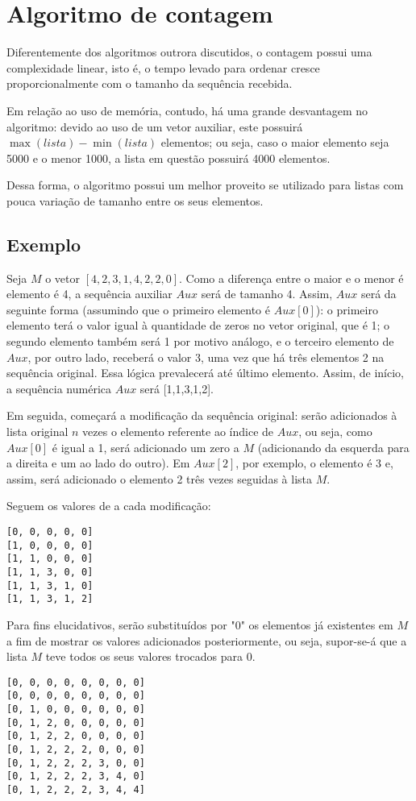 \section{Algoritmo de contagem}
Diferentemente dos algoritmos outrora discutidos, o contagem possui uma complexidade linear, isto é, o tempo levado para ordenar cresce proporcionalmente com o tamanho da sequência recebida. 

Em relação ao uso de memória, contudo, há uma grande desvantagem no algoritmo: devido ao uso de um vetor auxiliar, este possuirá $\max({lista})-\min({lista}) $ elementos; ou seja, caso o maior elemento seja 5000 e o menor 1000, a lista em questão possuirá 4000 elementos.

Dessa forma, o algoritmo possui um melhor proveito se utilizado para listas com pouca variação de tamanho entre os seus elementos.

\subsection{Exemplo}
Seja $M$ o vetor $[4,2,3,1,4,2,2,0]$. Como a diferença entre o maior e o menor é elemento é 4, a sequência auxiliar $Aux$ será de tamanho 4.
Assim, $Aux$ será da seguinte forma (assumindo que o primeiro elemento é $Aux[0]$): o primeiro elemento terá o valor igual à quantidade de zeros no vetor original, que é 1; o segundo elemento também será 1 por motivo análogo, e o terceiro elemento de $Aux$, por outro lado, receberá o valor 3, uma vez que há três elementos 2 na sequência original. Essa lógica prevalecerá até último elemento.
Assim, de início, a sequência numérica $Aux$ será [1,1,3,1,2].

Em seguida, começará a modificação da sequência original: serão adicionados à lista original $n$ vezes o elemento referente ao índice de $Aux$, ou seja, como $Aux[0]$ é igual a 1, será adicionado um zero a $M$ (adicionando da esquerda para a direita e um ao lado do outro). Em $Aux[2]$, por exemplo, o elemento é 3 e, assim, será adicionado o elemento 2 três vezes seguidas à lista $M$.

Seguem os valores de  a cada modificação:
\begin{lstlisting}
[0, 0, 0, 0, 0]
[1, 0, 0, 0, 0]
[1, 1, 0, 0, 0]
[1, 1, 3, 0, 0]
[1, 1, 3, 1, 0]
[1, 1, 3, 1, 2]
\end{lstlisting}
\newpage
Para fins elucidativos, serão substituídos por "0" os elementos já existentes em $M$ a fim de mostrar os valores adicionados posteriormente, ou seja, supor-se-á que a lista $M$ teve todos os seus valores trocados para 0.
\begin{lstlisting}
[0, 0, 0, 0, 0, 0, 0, 0]
[0, 0, 0, 0, 0, 0, 0, 0]
[0, 1, 0, 0, 0, 0, 0, 0]
[0, 1, 2, 0, 0, 0, 0, 0]
[0, 1, 2, 2, 0, 0, 0, 0]
[0, 1, 2, 2, 2, 0, 0, 0]
[0, 1, 2, 2, 2, 3, 0, 0]
[0, 1, 2, 2, 2, 3, 4, 0]
[0, 1, 2, 2, 2, 3, 4, 4] 
\end{lstlisting}

